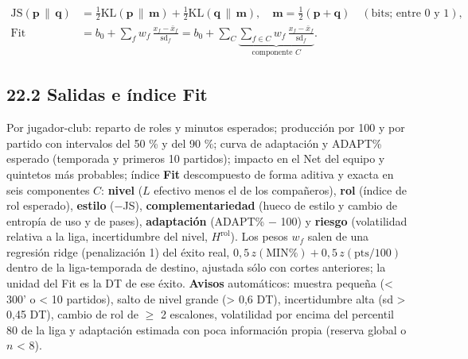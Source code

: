 \documentclass[10pt,a4paper]{article}
\begin{document}
\[
\begin{aligned} \mathrm{JS}(\mathbf p \,\|\, \mathbf q) &= \tfrac12 \mathrm{KL}(\mathbf p \,\|\, \mathbf m) + \tfrac12 \mathrm{KL}(\mathbf q \,\|\, \mathbf m),\quad \mathbf m = \tfrac12(\mathbf p + \mathbf q) \quad (\text{bits; entre 0 y 1}),\\ \mathrm{Fit} &= b_0 + \sum_{f} w_f\,\frac{x_f - \bar x_f}{\mathrm{sd}_f} = b_0 + \sum_{C} \underbrace{\sum_{f \in C} w_f\,\frac{x_f - \bar x_f}{\mathrm{sd}_f}}_{\text{componente } C} . \end{aligned}
\]
\subsection*{22.2 Salidas e índice Fit}
Por jugador-club: reparto de roles y minutos esperados; producción por 100 y por partido con intervalos del 50 \% y del 90 \%; curva de adaptación y ADAPT\% esperado (temporada y primeros 10 partidos); impacto en el Net del equipo y quintetos más probables; índice \textbf{Fit} descompuesto de forma aditiva y exacta en seis componentes $C$: \textbf{nivel} ($L$ efectivo menos el de los compañeros), \textbf{rol} (índice de rol esperado), \textbf{estilo} (\ensuremath{-}JS), \textbf{complementariedad} (hueco de estilo y cambio de entropía de uso y de pases), \textbf{adaptación} (ADAPT\% \ensuremath{-} 100) y \textbf{riesgo} (volatilidad relativa a la liga, incertidumbre del nivel, $H^{\mathrm{rol}}$). Los pesos $w_f$ salen de una regresión ridge (penalización 1) del éxito real, $0{,}5\,z(\mathrm{MIN\%}) + 0{,}5\,z(\mathrm{pts}/100)$ dentro de la liga-temporada de destino, ajustada sólo con cortes anteriores; la unidad del Fit es la DT de ese éxito. \textbf{Avisos} automáticos: muestra pequeña (< 300' o < 10 partidos), salto de nivel grande (> 0,6 DT), incertidumbre alta (sd > 0,45 DT), cambio de rol de \ensuremath{\geq} 2 escalones, volatilidad por encima del percentil 80 de la liga y adaptación estimada con poca información propia (reserva global o $n$ < 8).
\end{document}
